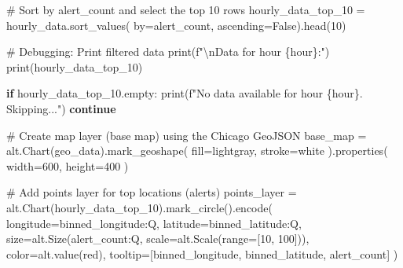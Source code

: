\documentclass[
  letterpaper,
  DIV=11,
  numbers=noendperiod]{scrartcl}
\newenvironment{Shaded}{\begin{snugshade}}{\end{snugshade}}
\newcommand{\BuiltInTok}[1]{\textcolor[rgb]{0.00,0.23,0.31}{#1}}
\newcommand{\CharTok}[1]{\textcolor[rgb]{0.13,0.47,0.30}{#1}}
\newcommand{\CommentTok}[1]{\textcolor[rgb]{0.37,0.37,0.37}{#1}}
\newcommand{\ControlFlowTok}[1]{\textcolor[rgb]{0.00,0.23,0.31}{\textbf{#1}}}
\newcommand{\DecValTok}[1]{\textcolor[rgb]{0.68,0.00,0.00}{#1}}
\newcommand{\NormalTok}[1]{\textcolor[rgb]{0.00,0.23,0.31}{#1}}
\newcommand{\OperatorTok}[1]{\textcolor[rgb]{0.37,0.37,0.37}{#1}}
\newcommand{\SpecialCharTok}[1]{\textcolor[rgb]{0.37,0.37,0.37}{#1}}
\newcommand{\SpecialStringTok}[1]{\textcolor[rgb]{0.13,0.47,0.30}{#1}}
\newcommand{\StringTok}[1]{\textcolor[rgb]{0.13,0.47,0.30}{#1}}
\newcommand{\VariableTok}[1]{\textcolor[rgb]{0.07,0.07,0.07}{#1}}
\begin{document}
\begin{Shaded}
\begin{Highlighting}[]
    \CommentTok{\# Sort by alert\_count and select the top 10 rows}
\NormalTok{    hourly\_data\_top\_10 }\OperatorTok{=}\NormalTok{ hourly\_data.sort\_values(}
\NormalTok{        by}\OperatorTok{=}\StringTok{\textquotesingle{}alert\_count\textquotesingle{}}\NormalTok{, ascending}\OperatorTok{=}\VariableTok{False}\NormalTok{).head(}\DecValTok{10}\NormalTok{)}

    \CommentTok{\# Debugging: Print filtered data}
    \BuiltInTok{print}\NormalTok{(}\SpecialStringTok{f"}\CharTok{\textbackslash{}n}\SpecialStringTok{Data for hour }\SpecialCharTok{\{}\NormalTok{hour}\SpecialCharTok{\}}\SpecialStringTok{:"}\NormalTok{)}
    \BuiltInTok{print}\NormalTok{(hourly\_data\_top\_10)}

    \ControlFlowTok{if}\NormalTok{ hourly\_data\_top\_10.empty:}
        \BuiltInTok{print}\NormalTok{(}\SpecialStringTok{f"No data available for hour }\SpecialCharTok{\{}\NormalTok{hour}\SpecialCharTok{\}}\SpecialStringTok{. Skipping..."}\NormalTok{)}
        \ControlFlowTok{continue}

    \CommentTok{\# Create map layer (base map) using the Chicago GeoJSON}
\NormalTok{    base\_map }\OperatorTok{=}\NormalTok{ alt.Chart(geo\_data).mark\_geoshape(}
\NormalTok{        fill}\OperatorTok{=}\StringTok{\textquotesingle{}lightgray\textquotesingle{}}\NormalTok{,}
\NormalTok{        stroke}\OperatorTok{=}\StringTok{\textquotesingle{}white\textquotesingle{}}
\NormalTok{    ).properties(}
\NormalTok{        width}\OperatorTok{=}\DecValTok{600}\NormalTok{,}
\NormalTok{        height}\OperatorTok{=}\DecValTok{400}
\NormalTok{    )}

    \CommentTok{\# Add points layer for top locations (alerts)}
\NormalTok{    points\_layer }\OperatorTok{=}\NormalTok{ alt.Chart(hourly\_data\_top\_10).mark\_circle().encode(}
\NormalTok{        longitude}\OperatorTok{=}\StringTok{\textquotesingle{}binned\_longitude:Q\textquotesingle{}}\NormalTok{,}
\NormalTok{        latitude}\OperatorTok{=}\StringTok{\textquotesingle{}binned\_latitude:Q\textquotesingle{}}\NormalTok{,}
\NormalTok{        size}\OperatorTok{=}\NormalTok{alt.Size(}\StringTok{\textquotesingle{}alert\_count:Q\textquotesingle{}}\NormalTok{, scale}\OperatorTok{=}\NormalTok{alt.Scale(}\BuiltInTok{range}\OperatorTok{=}\NormalTok{[}\DecValTok{10}\NormalTok{, }\DecValTok{100}\NormalTok{])),}
\NormalTok{        color}\OperatorTok{=}\NormalTok{alt.value(}\StringTok{\textquotesingle{}red\textquotesingle{}}\NormalTok{),}
\NormalTok{        tooltip}\OperatorTok{=}\NormalTok{[}\StringTok{\textquotesingle{}binned\_longitude\textquotesingle{}}\NormalTok{, }\StringTok{\textquotesingle{}binned\_latitude\textquotesingle{}}\NormalTok{, }\StringTok{\textquotesingle{}alert\_count\textquotesingle{}}\NormalTok{]}
\NormalTok{    )}


\end{Highlighting}
\end{Shaded}
\end{document}
